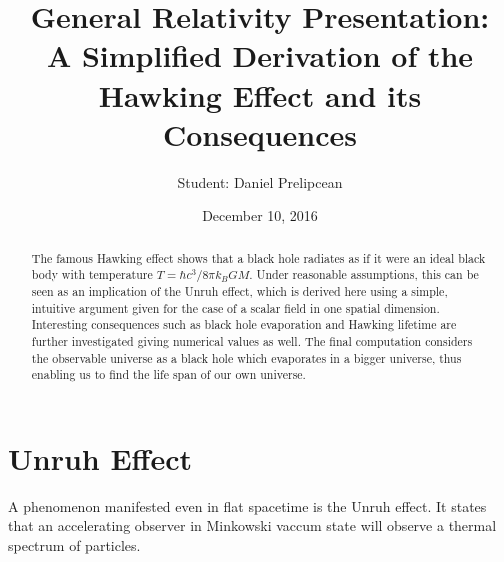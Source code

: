 \documentclass[%
 aip,
 jmp,%
 amsmath,amssymb,
 reprint,%
]{revtex4-1}
\begin{document}
\title[A Simplified Derivation of the Hawking Effect and its Consequences]{General Relativity Presentation:\\ A Simplified Derivation of the Hawking Effect and its Consequences}%


\author{Student: Daniel Prelipcean}
%

\date{December 10, 2016}%

\begin{abstract}
The famous Hawking effect shows that a black hole radiates as if it were an ideal black body with temperature $T = \hbar c^3 / 8 \pi k_B G M$. Under reasonable assumptions, this can be seen as an implication of the Unruh effect, which is derived here using a simple, intuitive argument given for the case of a scalar field in one spatial dimension. Interesting consequences such as black hole evaporation and Hawking lifetime are further investigated giving numerical values as well. The final computation considers the observable universe as a black hole which evaporates in a bigger universe, thus enabling us to find the life span of our own universe.
\end{abstract}

\maketitle


\section{Unruh Effect}

A phenomenon manifested even in flat spacetime is the Unruh effect. It states that an accelerating observer in Minkowski vaccum state will observe a thermal spectrum of particles.
\end{document}
